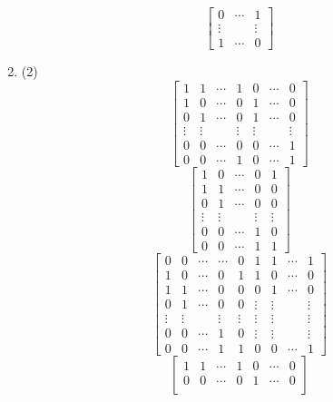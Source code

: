 \documentclass[12pt, A4]{article}
\begin{document}
\begin{enumerate}
\begin{tasks}
\[\begin{bmatrix}
								0 & \cdots & 1 \\
								\vdots & & \vdots \\
								1 & \cdots & 0	
							\end{bmatrix}\]
					\end{tasks}
				\item
					\begin{tasks}(2)
						\task
							\[\begin{bmatrix}
								1 & 1 & \cdots & 1 & 0 & \cdots & 0 \\
								1 & 0 & \cdots & 0 & 1 & \cdots & 0 \\
								0 & 1 & \cdots & 0 & 1 & \cdots & 0 \\
								\vdots & \vdots & & \vdots & \vdots & & \vdots \\
								0 & 0 & \cdots & 0 & 0 & \cdots & 1 \\
								0 & 0 & \cdots & 1 & 0 & \cdots & 1
							\end{bmatrix}\]
						\task
							\[\begin{bmatrix}
								1 & 0 & \cdots & 0 & 1 \\
								1 & 1 & \cdots & 0 & 0 \\
								0 & 1 & \cdots & 0 & 0 \\
								\vdots & \vdots & & \vdots & \vdots \\
								0 & 0 & \cdots & 1 & 0 \\
								0 & 0 & \cdots & 1 & 1
							\end{bmatrix}\]
						\task
							\[\begin{bmatrix}
								0 & 0 & \cdots & \cdots & 0 & 1 & 1 & \cdots & 1 \\
								1 & 0 & \cdots & 0 & 1 & 1 & 0 & \cdots & 0 \\
								1 & 1 & \cdots & 0 & 0  & 0 & 1 & \cdots & 0 \\
								0 & 1 & \cdots & 0 & 0  & \vdots & \vdots & & \vdots \\
								\vdots & \vdots & & \vdots & \vdots & \vdots & \vdots & & \vdots \\
								0 & 0 & \cdots & 1 & 0 & \vdots & \vdots & & \vdots \\
								0 & 0 & \cdots & 1 & 1 & 0 & 0 & \cdots & 1
							\end{bmatrix}\]
						\task
							\[\begin{bmatrix}
								1 & 1 & \cdots & 1 & 0 & \cdots & 0 \\
								0 & 0 & \cdots & 0 & 1 & \cdots & 0 \\

\end{bmatrix}\]
\end{tasks}
\end{enumerate}
\end{document}
